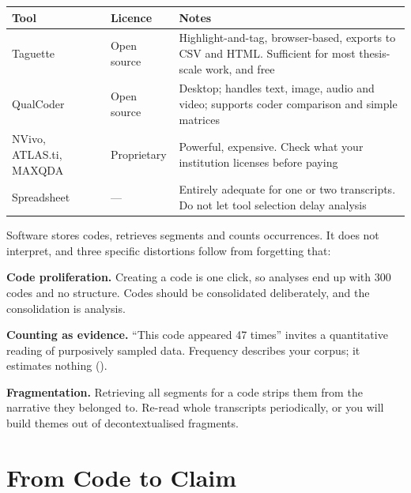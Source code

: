 \begin{center}
\small
\begin{tabular}{@{}L{2.6cm}L{3.0cm}L{8.5cm}@{}}
\toprule
\textbf{Tool} & \textbf{Licence} & \textbf{Notes} \\
\midrule
Taguette   & Open source
           & Highlight-and-tag, browser-based, exports to CSV and HTML.
             Sufficient for most thesis-scale work, and free \\
QualCoder  & Open source
           & Desktop; handles text, image, audio and video; supports coder
             comparison and simple matrices \\
NVivo, ATLAS.ti, MAXQDA & Proprietary
           & Powerful, expensive. Check what your institution licenses before
             paying \\
Spreadsheet & ---
           & Entirely adequate for one or two transcripts. Do not let tool
             selection delay analysis \\
\bottomrule
\end{tabular}
\end{center}

\begin{pitfall}
Software stores codes, retrieves segments and counts occurrences. It does not
interpret, and three specific distortions follow from forgetting that:

\begin{tight}
  \item \textbf{Code proliferation.} Creating a code is one click, so analyses
    end up with 300 codes and no structure. Codes should be consolidated
    deliberately, and the consolidation is analysis.
  \item \textbf{Counting as evidence.} ``This code appeared 47 times'' invites
    a quantitative reading of purposively sampled data. Frequency describes
    your corpus; it estimates nothing ().
  \item \textbf{Fragmentation.} Retrieving all segments for a code strips them
    from the narrative they belonged to. Re-read whole transcripts periodically,
    or you will build themes out of decontextualised fragments.
\end{tight}
\end{pitfall}

\section{From Code to Claim}

